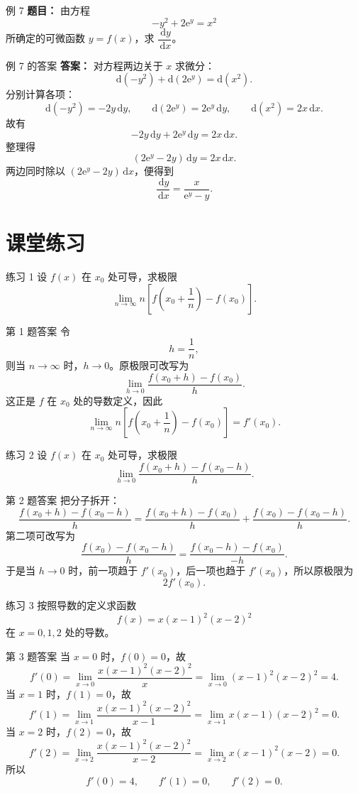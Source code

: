 ﻿\documentclass[aspectratio=169,11pt]{ctexbeamer}
\newcommand{\e}{\mathrm{e}}
\newcommand{\dx}{\,\mathrm{d}x}
\newcommand{\dy}{\,\mathrm{d}y}
\begin{document}
\begin{frame}{例 7}
\small
\textbf{题目：} 由方程
\[
-y^2+2\e^y=x^2
\]
所确定的可微函数 $y=f(x)$，求 $\dfrac{\dy}{\dx}$。
\end{frame}

\begin{frame}{例 7 的答案}
\small
\textbf{答案：} 对方程两边关于 $x$ 求微分：
\[
\mathrm{d}(-y^2)+\mathrm{d}(2\e^y)=\mathrm{d}(x^2).
\]
分别计算各项：
\[
\mathrm{d}(-y^2)=-2y\dy,\qquad
\mathrm{d}(2\e^y)=2\e^y\dy,\qquad
\mathrm{d}(x^2)=2x\dx.
\]
故有
\[
-2y\dy+2\e^y\dy=2x\dx.
\]
整理得
\[
(2\e^y-2y)\dy=2x\dx.
\]
两边同时除以 $(2\e^y-2y)\dx$，便得到
\[
\frac{\dy}{\dx}=\frac{x}{\e^y-y}.
\]
\end{frame}
\section{课堂练习}

\begin{frame}{练习 1}
\footnotesize
设 $f(x)$ 在 $x_0$ 处可导，求极限
\[
\lim_{n\to\infty}n\left[f\left(x_0+\frac1n\right)-f(x_0)\right].
\]
\end{frame}

\begin{frame}{第 1 题答案}
\footnotesize
令
\[
h=\frac1n,
\]
则当 $n\to\infty$ 时，$h\to 0$。原极限可改写为
\[
\lim_{h\to0}\frac{f(x_0+h)-f(x_0)}{h}.
\]
这正是 $f$ 在 $x_0$ 处的导数定义，因此
\[
\lim_{n\to\infty}n\left[f\left(x_0+\frac1n\right)-f(x_0)\right]=f'(x_0).
\]
\end{frame}

\begin{frame}{练习 2}
\footnotesize
设 $f(x)$ 在 $x_0$ 处可导，求极限
\[
\lim_{h\to0}\frac{f(x_0+h)-f(x_0-h)}{h}.
\]
\end{frame}

\begin{frame}{第 2 题答案}
\footnotesize
把分子拆开：
\[
\frac{f(x_0+h)-f(x_0-h)}{h}
=\frac{f(x_0+h)-f(x_0)}{h}+\frac{f(x_0)-f(x_0-h)}{h}.
\]
第二项可改写为
\[
\frac{f(x_0)-f(x_0-h)}{h}=\frac{f(x_0-h)-f(x_0)}{-h}.
\]
于是当 $h\to0$ 时，前一项趋于 $f'(x_0)$，后一项也趋于 $f'(x_0)$，所以原极限为
\[
2f'(x_0).
\]
\end{frame}

\begin{frame}{练习 3}
\footnotesize
按照导数的定义求函数
\[
f(x)=x(x-1)^2(x-2)^2
\]
在 $x=0,1,2$ 处的导数。
\end{frame}

\begin{frame}{第 3 题答案}
\footnotesize
当 $x=0$ 时，$f(0)=0$，故
\[
f'(0)=\lim_{x\to0}\frac{x(x-1)^2(x-2)^2}{x}=\lim_{x\to0}(x-1)^2(x-2)^2=4.
\]
当 $x=1$ 时，$f(1)=0$，故
\[
f'(1)=\lim_{x\to1}\frac{x(x-1)^2(x-2)^2}{x-1}=\lim_{x\to1}x(x-1)(x-2)^2=0.
\]
当 $x=2$ 时，$f(2)=0$，故
\[
f'(2)=\lim_{x\to2}\frac{x(x-1)^2(x-2)^2}{x-2}=\lim_{x\to2}x(x-1)^2(x-2)=0.
\]
所以
\[
f'(0)=4,\qquad f'(1)=0,\qquad f'(2)=0.
\]
\end{frame}
\end{document}
